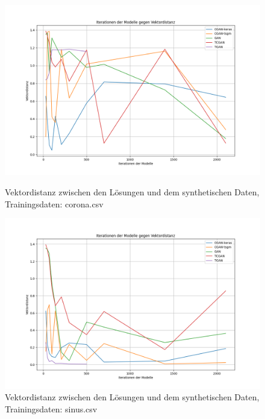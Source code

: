 \begin{figure}[ht]
    \centering
    \begin{minipage}{0.499\textwidth}
        \centering
        \includegraphics[width=\textwidth]{includes/figures/graphs/Iteration_attacker.similaritycorona.png}
        \caption{Vektordistanz zwischen den Lösungen und dem synthetischen Daten, Trainingsdaten: corona.csv}
        \label{fig:vect_dist_corona}
    \end{minipage}\hfill
    \begin{minipage}{0.499\textwidth}
        \centering
        \includegraphics[width=\textwidth]{includes/figures/graphs/Iteration_attacker.similaritysinus.png}
        \caption{Vektordistanz zwischen den Lösungen und dem synthetischen Daten, Trainingsdaten: sinus.csv}
        \label{fig:vect_dist_sinus}
    \end{minipage}
\end{figure}

